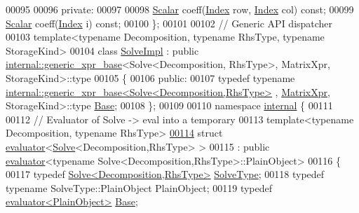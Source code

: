 \begin{DoxyCode}
00095 
00096 \textcolor{keyword}{private}:
00097   
00098   \hyperlink{group___core___module_a5feed465b3a8e60c47e73ecce83e39a2}{Scalar} coeff(\hyperlink{namespace_eigen_a62e77e0933482dafde8fe197d9a2cfde}{Index} row, \hyperlink{namespace_eigen_a62e77e0933482dafde8fe197d9a2cfde}{Index} col) \textcolor{keyword}{const};
00099   \hyperlink{group___core___module_a5feed465b3a8e60c47e73ecce83e39a2}{Scalar} coeff(\hyperlink{namespace_eigen_a62e77e0933482dafde8fe197d9a2cfde}{Index} i) \textcolor{keyword}{const};
00100 \};
00101 
00102 \textcolor{comment}{// Generic API dispatcher}
00103 \textcolor{keyword}{template}<\textcolor{keyword}{typename} Decomposition, \textcolor{keyword}{typename} RhsType, \textcolor{keyword}{typename} StorageKind>
00104 \textcolor{keyword}{class }\hyperlink{class_eigen_1_1_solve_impl}{SolveImpl} : \textcolor{keyword}{public} \hyperlink{struct_eigen_1_1internal_1_1generic__xpr__base}{internal::generic\_xpr\_base}<Solve<Decomposition,
      RhsType>, MatrixXpr, StorageKind>::type
00105 \{
00106   \textcolor{keyword}{public}:
00107     \textcolor{keyword}{typedef} \textcolor{keyword}{typename} \hyperlink{struct_eigen_1_1internal_1_1generic__xpr__base}{internal::generic\_xpr\_base<Solve<Decomposition,RhsType>}
      , \hyperlink{struct_eigen_1_1_matrix_xpr}{MatrixXpr}, StorageKind>::type \hyperlink{class_eigen_1_1_dense_coeffs_base}{Base};
00108 \};
00109 
00110 \textcolor{keyword}{namespace }\hyperlink{namespaceinternal}{internal} \{
00111 
00112 \textcolor{comment}{// Evaluator of Solve -> eval into a temporary}
00113 \textcolor{keyword}{template}<\textcolor{keyword}{typename} Decomposition, \textcolor{keyword}{typename} RhsType>
\hyperlink{struct_eigen_1_1internal_1_1evaluator_3_01_solve_3_01_decomposition_00_01_rhs_type_01_4_01_4}{00114} \textcolor{keyword}{struct }\hyperlink{struct_eigen_1_1internal_1_1evaluator}{evaluator}<\hyperlink{group___core___module_class_eigen_1_1_solve}{Solve}<Decomposition,RhsType> >
00115   : \textcolor{keyword}{public} \hyperlink{struct_eigen_1_1internal_1_1evaluator}{evaluator}<typename Solve<Decomposition,RhsType>::PlainObject>
00116 \{
00117   \textcolor{keyword}{typedef} \hyperlink{group___core___module_class_eigen_1_1_solve}{Solve<Decomposition,RhsType>} \hyperlink{group___core___module_class_eigen_1_1_solve}{SolveType};
00118   \textcolor{keyword}{typedef} \textcolor{keyword}{typename} SolveType::PlainObject PlainObject;
00119   \textcolor{keyword}{typedef} \hyperlink{struct_eigen_1_1internal_1_1evaluator}{evaluator<PlainObject>} \hyperlink{struct_eigen_1_1internal_1_1evaluator}{Base};

\end{DoxyCode}
